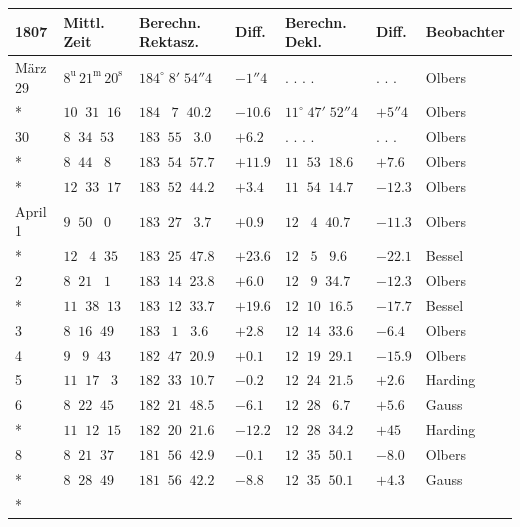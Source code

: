 \begingroup\fontsize{9}{11}\selectfont\setlength{\tabcolsep}{2.5pt}\renewcommand{\arraystretch}{1.10}
\begin{longtable}{l|l|l|l|l|l|l}
1807 & Mittl. Zeit & Berechn. Rektasz. & Diff. & Berechn. Dekl. & Diff. & Beobachter \\
\hline
\endhead
März 29 & $8^{\mathrm u}\,21^{\mathrm m}\,20^{\mathrm s}$ & $184^\circ\;8'\;54''4$ & $-1''4$ & . . . . & . . . & Olbers \\*
        & $10\;\;31\;\;16$ & $184\;\;\;7\;\;40.2$ & $-10.6$ & $11^\circ\;47'\;52''4$ & $+5''4$ & Olbers \\
30      & $8\;\;34\;\;53$ & $183\;\;55\;\;\;3.0$ & $+6.2$ & . . . . & . . . & Olbers \\*
        & $8\;\;44\;\;\;8$ & $183\;\;54\;\;57.7$ & $+11.9$ & $11\;\;53\;\;18.6$ & $+7.6$ & Olbers \\*
        & $12\;\;33\;\;17$ & $183\;\;52\;\;44.2$ & $+3.4$ & $11\;\;54\;\;14.7$ & $-12.3$ & Olbers \\
April 1 & $9\;\;50\;\;\;0$ & $183\;\;27\;\;\;3.7$ & $+0.9$ & $12\;\;\;4\;\;40.7$ & $-11.3$ & Olbers \\*
        & $12\;\;\;4\;\;35$ & $183\;\;25\;\;47.8$ & $+23.6$ & $12\;\;\;5\;\;\;9.6$ & $-22.1$ & Bessel \\
2       & $8\;\;21\;\;\;1$ & $183\;\;14\;\;23.8$ & $+6.0$ & $12\;\;\;9\;\;34.7$ & $-12.3$ & Olbers \\*
        & $11\;\;38\;\;13$ & $183\;\;12\;\;33.7$ & $+19.6$ & $12\;\;10\;\;16.5$ & $-17.7$ & Bessel \\
3       & $8\;\;16\;\;49$ & $183\;\;\;1\;\;\;3.6$ & $+2.8$ & $12\;\;14\;\;33.6$ & $-6.4$ & Olbers \\
4       & $9\;\;\;9\;\;43$ & $182\;\;47\;\;20.9$ & $+0.1$ & $12\;\;19\;\;29.1$ & $-15.9$ & Olbers \\
5       & $11\;\;17\;\;\;3$ & $182\;\;33\;\;10.7$ & $-0.2$ & $12\;\;24\;\;21.5$ & $+2.6$ & Harding \\
6       & $8\;\;22\;\;45$ & $182\;\;21\;\;48.5$ & $-6.1$ & $12\;\;28\;\;\;6.7$ & $+5.6$ & Gauss \\*
        & $11\;\;12\;\;15$ & $182\;\;20\;\;21.6$ & $-12.2$ & $12\;\;28\;\;34.2$ & $+45$ & Harding \\
8       & $8\;\;21\;\;37$ & $181\;\;56\;\;42.9$ & $-0.1$ & $12\;\;35\;\;50.1$ & $-8.0$ & Olbers \\*
        & $8\;\;28\;\;49$ & $181\;\;56\;\;42.2$ & $-8.8$ & $12\;\;35\;\;50.1$ & $+4.3$ & Gauss \\*

\end{longtable}

